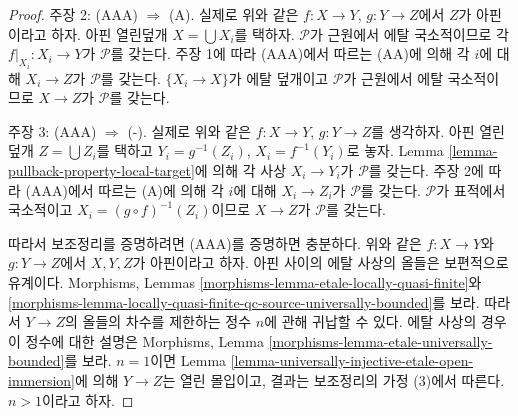 \begin{proof}
\medskip\noindent
주장 2: (AAA) $\Rightarrow$ (A).
실제로 위와 같은 $f : X \to Y$, $g : Y \to Z$에서 $Z$가 아핀이라고
하자. 아핀 열린덮개 $X = \bigcup X_i$를 택하자. $\mathcal{P}$가
근원에서 에탈 국소적이므로 각 $f|_{X_i} : X_i \to Y$가
$\mathcal{P}$를 갖는다. 주장 1에 따라 (AAA)에서 따르는 (AA)에 의해
각 $i$에 대해 $X_i \to Z$가 $\mathcal{P}$를 갖는다.
$\{X_i \to X\}$가 에탈 덮개이고 $\mathcal{P}$가 근원에서 에탈
국소적이므로 $X \to Z$가 $\mathcal{P}$를 갖는다.

\medskip\noindent
주장 3: (AAA) $\Rightarrow$ (-).
실제로 위와 같은 $f : X \to Y$, $g : Y \to Z$를 생각하자.
아핀 열린덮개 $Z = \bigcup Z_i$를 택하고
$Y_i = g^{-1}(Z_i)$, $X_i = f^{-1}(Y_i)$로 놓자. Lemma
\ref{lemma-pullback-property-local-target}에 의해 각 사상
$X_i \to Y_i$가 $\mathcal{P}$를 갖는다. 주장 2에 따라 (AAA)에서
따르는 (A)에 의해 각 $i$에 대해 $X_i \to Z_i$가 $\mathcal{P}$를
갖는다. $\mathcal{P}$가 표적에서 국소적이고
$X_i = (g \circ f)^{-1}(Z_i)$이므로 $X \to Z$가 $\mathcal{P}$를
갖는다.

\medskip\noindent
따라서 보조정리를 증명하려면 (AAA)를 증명하면 충분하다. 위와 같은
$f : X \to Y$와 $g : Y \to Z$에서 $X, Y, Z$가 아핀이라고 하자.
아핀 사이의 에탈 사상의 올들은 보편적으로 유계이다. Morphisms,
Lemmas \ref{morphisms-lemma-etale-locally-quasi-finite}와
\ref{morphisms-lemma-locally-quasi-finite-qc-source-universally-bounded}를
보라. 따라서 $Y \to Z$의 올들의 차수를 제한하는 정수 $n$에 관해
귀납할 수 있다. 에탈 사상의 경우 이 정수에 대한 설명은 Morphisms,
Lemma \ref{morphisms-lemma-etale-universally-bounded}를 보라.
$n = 1$이면 Lemma
\ref{lemma-universally-injective-etale-open-immersion}에 의해
$Y \to Z$는 열린 몰입이고, 결과는 보조정리의 가정 (3)에서 따른다.
$n > 1$이라고 하자.


\end{proof}
